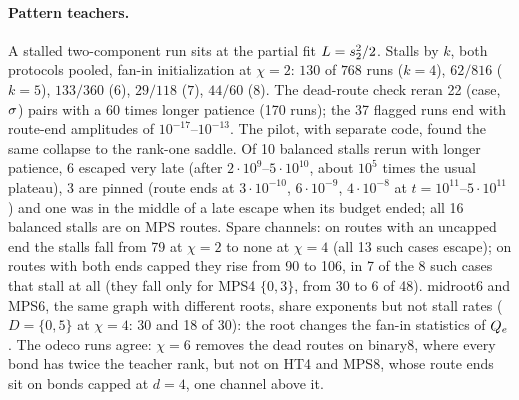 \paragraph{Pattern teachers.}
\empirical{} A stalled two-component run sits at the partial fit $L=s_{2}^2/2$. Stalls by $k$, both protocols pooled,
fan-in initialization at $\chi=2$: $130$ of $768$ runs ($k=4$),
$62/816$ ($k=5$), $133/360$ ($6$), $29/118$ ($7$), $44/60$ ($8$). The dead-route check reran 22 (case, $\sigma$) pairs
with a 60 times longer patience (170 runs); the 37 flagged runs end with route-end amplitudes of
$10^{-17}$--$10^{-13}$. The pilot, with separate code, found the same collapse to the rank-one saddle. Of 10 balanced
stalls rerun with longer patience, 6 escaped very late (after $2\cdot10^9$--$5\cdot10^{10}$, about $10^5$ times the usual
plateau), 3 are pinned (route ends at $3\cdot10^{-10}$, $6\cdot10^{-9}$, $4\cdot10^{-8}$ at $t=10^{11}$--$5\cdot10^{11}$)
and one was in the middle of a late escape when its budget ended; all 16 balanced stalls are on MPS routes. Spare
channels: on routes with an uncapped end the stalls fall from 79 at $\chi=2$ to none at $\chi=4$ (all 13 such cases
escape); on routes with both ends capped they rise from 90 to 106, in 7 of the 8 such cases that stall at all (they
fall only for MPS4 $\{0,3\}$, from 30 to 6 of 48). midroot6 and MPS6, the same graph with different roots, share
exponents but not stall rates ($D=\{0,5\}$ at $\chi=4$: 30 and 18 of 30): the root changes the fan-in statistics of
$Q_{e}$. The odeco runs agree: $\chi=6$ removes the dead routes on binary8, where every bond has twice the teacher
rank, but not on HT4 and MPS8, whose route ends sit on bonds capped at $d=4$, one channel above it.


